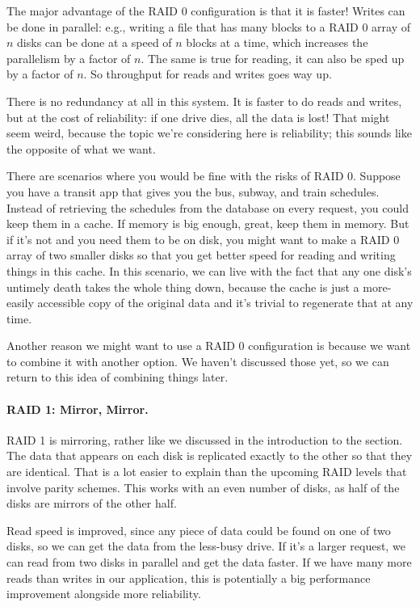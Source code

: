 The major advantage of the RAID 0 configuration is that it is faster! Writes can be done in parallel: e.g., writing a file that has many blocks to a RAID 0 array of $n$ disks can be done at a speed of $n$ blocks at a time, which increases the parallelism by a factor of $n$. The same is true for reading, it can also be sped up by a factor of $n$. So throughput for reads and writes goes way up.

There is no redundancy at all in this system. It is faster to do reads and writes, but at the cost of reliability: if one drive dies, all the data is lost! That might seem weird, because the topic we're considering here is reliability; this sounds like the opposite of what we want.

There are scenarios where you would be fine with the risks of RAID 0. Suppose you have a transit app that gives you the bus, subway, and train schedules. Instead of retrieving the schedules from the database on every request, you could keep them in a cache. If memory is big enough, great, keep them in memory. But if it's not and you need them to be on disk, you might want to make a RAID 0 array of two smaller disks so that you get better speed for reading and writing things in this cache. In this scenario, we can live with the fact that any one disk's untimely death takes the whole thing down, because the cache is just a more-easily accessible copy of the original data and it's trivial to regenerate that at any time.

Another reason we might want to use a RAID 0 configuration is because we want to combine it with another option. We haven't discussed those yet, so we can return to this idea of combining things later.

\paragraph{RAID 1: Mirror, Mirror.}
RAID 1 is mirroring, rather like we discussed in the introduction to the section. The data that appears on each disk is replicated exactly to the other so that they are identical. That is a lot easier to explain than the upcoming RAID levels that involve parity schemes. This works with an even number of disks, as half of the disks are mirrors of the other half.

Read speed is improved, since any piece of data could be found on one of two disks, so we can get the data from the less-busy drive. If it's a larger request, we can read from two disks in parallel and get the data faster. If we have many more reads than writes in our application, this is potentially a big performance improvement alongside more reliability.

